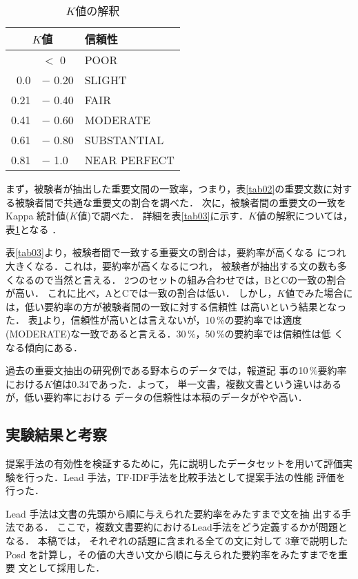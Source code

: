 \begin{table}[t]
 \begin{center}
  \caption{$K$値の解釈}
  \label{tab030}
  \begin{tabular}{rll}
   \hline
   \hline
   \multicolumn{2}{c}{$K$値}  & 信頼性\\
   \hline
    &$<$ 0 & POOR\\
   0.0 &$-$ 0.20 & SLIGHT\\
   0.21 &$-$ 0.40 & FAIR\\
   0.41 &$-$ 0.60 & MODERATE\\
   0.61 &$-$ 0.80 & SUBSTANTIAL\\
   0.81 &$-$ 1.0 & NEAR PERFECT\\
   \hline
  \end{tabular}
 \end{center}
\end{table}

まず，被験者が抽出した重要文間の一致率，つまり，表\ref{tab02}の重要文数に対す
る被験者間で共通な重要文の割合を調べた．
次に，被験者間の重要文の一致を Kappa 統計値($K$値)で調べた．
詳細を表\ref{tab03}に示す．$K$値の解釈については，表\ref{tab030}となる
\cite{article54}．

表\ref{tab03}より，被験者間で一致する重要文の割合は，要約率が高くなる
につれ大きくなる．これは，要約率が高くなるにつれ，
被験者が抽出する文の数も多くなるので当然と言える．
2つのセットの組み合わせでは，BとCの一致の割合が高い．
これに比べ，AとCでは一致の割合は低い．
しかし，$K$値でみた場合には，低い要約率の方が被験者間の一致に対する信頼性
は高いという結果となった．
表\ref{tab030}より，信頼性が高いとは言えないが，10\,\%の要約率では適度
(MODERATE)な一致であると言える．30\,\%，50\,\%の要約率では信頼性は低
くなる傾向にある．

過去の重要文抽出の研究例である野本らのデータ\cite{article6}では，報道記
事の10\,\%要約率における$K値$は0.34であった．よって，
単一文書，複数文書という違いはあるが，低い要約率における
データの信頼性は本稿のデータがやや高い．

\subsection{実験結果と考察}

提案手法の有効性を検証するために，先に説明したデータセットを用いて評価実
験を行った．Lead 手法，TF$\cdot$IDF手法を比較手法として提案手法の性能
評価を行った．

Lead 手法は文書の先頭から順に与えられた要約率をみたすまで文を抽
出する手法である．
ここで，複数文書要約におけるLead手法をどう定義するかが問題となる．
本稿では，
それぞれの話題に含まれる全ての文に対して 3章で説明した
Posd を計算し，その値の大きい文から順に与えられた要約率をみたすまでを重要
文として採用した．

